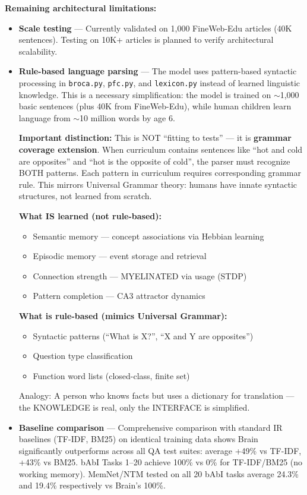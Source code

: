 \documentclass[11pt]{article}
\begin{document}
\textbf{Remaining architectural limitations:}
\begin{itemize}
\item \textbf{Scale testing} --- Currently validated on 1,000 FineWeb-Edu articles (40K sentences). 
      Testing on 10K+ articles is planned to verify architectural scalability.
\item \textbf{Rule-based language parsing} --- The model uses pattern-based syntactic processing in 
      \texttt{broca.py}, \texttt{pfc.py}, and \texttt{lexicon.py} instead of learned linguistic knowledge. 
      This is a necessary simplification: the model is trained on $\sim$1{,}000 basic sentences (plus 40K from FineWeb-Edu), while human children 
      learn language from $\sim$10 million words by age 6. 
      
      \textbf{Important distinction:} This is NOT ``fitting to tests'' --- it is \textbf{grammar coverage extension}.
      When curriculum contains sentences like ``hot and cold are opposites'' and ``hot is the opposite of cold'',
      the parser must recognize BOTH patterns. Each pattern in curriculum requires corresponding grammar rule.
      This mirrors Universal Grammar theory: humans have innate syntactic structures, not learned from scratch.
      
      \textbf{What IS learned (not rule-based):}
      \begin{itemize}
        \item Semantic memory --- concept associations via Hebbian learning
        \item Episodic memory --- event storage and retrieval  
        \item Connection strength --- MYELINATED via usage (STDP)
        \item Pattern completion --- CA3 attractor dynamics
      \end{itemize}
      
      \textbf{What is rule-based (mimics Universal Grammar):}
      \begin{itemize}
        \item Syntactic patterns (``What is X?'', ``X and Y are opposites'')
        \item Question type classification
        \item Function word lists (closed-class, finite set)
      \end{itemize}
      
      Analogy: A person who knows facts but uses a dictionary for translation --- 
      the KNOWLEDGE is real, only the INTERFACE is simplified.
\item \textbf{Baseline comparison} --- Comprehensive comparison with standard IR baselines (TF-IDF, BM25)
      on identical training data shows Brain significantly outperforms across all QA test suites:
      average +49\% vs TF-IDF, +43\% vs BM25. bAbI Tasks 1--20 achieve 100\% vs 0\% for
      TF-IDF/BM25 (no working memory). MemNet/NTM tested on all 20 bAbI tasks average
      24.3\% and 19.4\% respectively vs Brain's 100\%.
      

\end{itemize}
\end{document}

